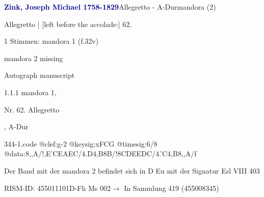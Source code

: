 \documentclass[twocolumn, 12pt]{book}
\begin{document}
\par \vspace{16pt} \textcolor{darkblue}{\textbf{Zink, Joseph Michael  1758-1829}}\hfillplus{\textbf{[344]}}\newline Allegretto - A-Dur\newline mandora (2)
\par \begin{itshape}[f.32v, at left:] Allegretto | [left before the accolade:] 62.\end{itshape} 
\par \textcolor{darkblue}{}  1 Stimmen: mandora 1  (f.32v)\newline \begin{small} mandora 2 missing\end{small} \newline Autograph manuscript
\par 1.1.1  mandora 1, \begin{itshape}Nr. 62. Allegretto\end{itshape}, A-Dur  
\begin{filecontents*}{344-1.code}
@clef:g-2
@keysig:xFCG
@timesig:6/8
@data:8,,A/!,E'CEAEC/4.D4,B8B/!8CDEEDC/4.'C4,B8,,A/f
\end{filecontents*}
\newline %
\par Der Band mit der mandora 2 befindet sich in D Eu mit der Signatur Esl VIII 403
\par RISM-ID: 455011101\newline D-Fh  Ms 002\newline $\rightarrow$ In Sammlung 419 (455008345)
      
\end{document}
